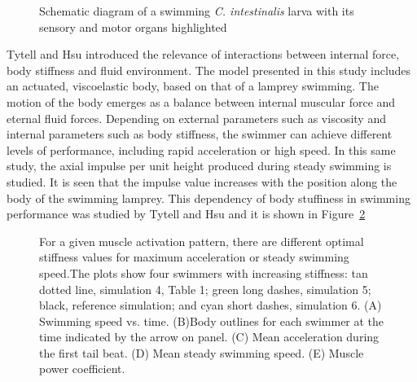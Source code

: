 \begin{figure}[H]
\centering
  \begin{footnotesize}
  
  \caption[Schematic diagram of a swimming \textit{C. intestinalis} larva with its sensory and motor organs highlighted]{Schematic diagram of a swimming \textit{C. intestinalis} larva with its sensory and motor organs highlighted}
  \label{fig:Bild3.7}
  \end{footnotesize}
\end{figure} 



Tytell and Hsu \cite{tytell_interactions_2010} introduced the relevance of interactions between internal force, body stiffness and fluid environment. The model presented in this
study includes an actuated, viscoelastic body, based on that of a lamprey swimming. The motion of the body emerges as a balance between internal muscular force and eternal fluid
forces. Depending on external parameters such as viscosity and internal parameters such as body stiffness, the swimmer can achieve different levels of performance, including
rapid acceleration or high speed. In this same study, the axial impulse per unit height produced during steady swimming is studied. It is seen that the impulse value increases with the position
along the body of the swimming lamprey. This dependency of body stuffiness in swimming performance was studied by Tytell and Hsu and it is shown in Figure~\ref{fig:Bild3.8}
\par


\begin{figure}[H]
\centering
  \begin{footnotesize}
  
  \caption[For a given muscle activation pattern, there are different optimal stiffness values for maximum acceleration or steady swimming speed.The plots show four swimmers 
  with increasing stiffness: tan dotted line, simulation 4, Table 1; green long dashes, simulation 5; black, reference simulation; and cyan short dashes, simulation 6. (A)
  Swimming speed vs. time. (B)Body outlines for each swimmer at the time indicated by the arrow on panel. (C) Mean acceleration during the first tail beat. (D) Mean steady
  swimming speed. (E) Muscle power coefficient]{For a given muscle activation pattern, there are different optimal stiffness values for maximum acceleration or steady swimming speed.The plots show four swimmers 
  with increasing stiffness: tan dotted line, simulation 4, Table 1; green long dashes, simulation 5; black, reference simulation; and cyan short dashes, simulation 6. (A)
  Swimming speed vs. time. (B)Body outlines for each swimmer at the time indicated by the arrow on panel. (C) Mean acceleration during the first tail beat. (D) Mean steady
  swimming speed. (E) Muscle power coefficient. \cite{tytell_interactions_2010}}
  \label{fig:Bild3.8}
  \end{footnotesize}
\end{figure} 






